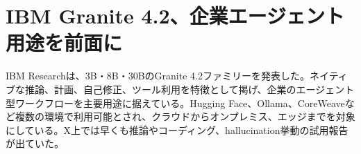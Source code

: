 \section{IBM Granite 4.2、企業エージェント用途を前面に}
IBM Researchは、3B・8B・30BのGranite 4.2ファミリーを発表した。ネイティブな推論、計画、自己修正、ツール利用を特徴として掲げ、企業のエージェント型ワークフローを主要用途に据えている。Hugging Face、Ollama、CoreWeaveなど複数の環境で利用可能とされ、クラウドからオンプレミス、エッジまでを対象にしている。X上では早くも推論やコーディング、hallucination挙動の試用報告が出ていた。
